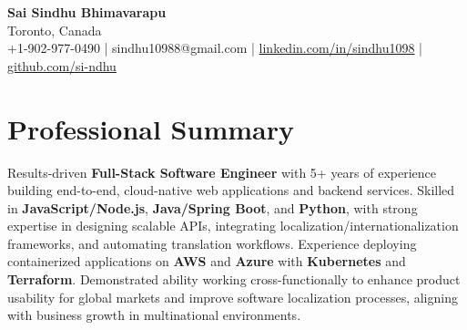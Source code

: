 \documentclass[letterpaper,11pt]{article}
\begin{document}
\begin{center}
  {\Large \textbf{Sai Sindhu Bhimavarapu}} \\
  Toronto, Canada \\
  +1-902-977-0490 \enspace | \enspace sindhu10988@gmail.com \enspace | \enspace \href{https://www.linkedin.com/in/sindhu1098/}{linkedin.com/in/sindhu1098} \enspace | \enspace \href{https://github.com/si-ndhu}{github.com/si-ndhu}
\end{center}

\section{Professional Summary}
  \begin{itemize}[leftmargin=0.15in, label={}]
    \small{\item{
     Results-driven \textbf{Full-Stack Software Engineer} with 5+ years of experience building end-to-end, cloud-native web applications and backend services. Skilled in \textbf{JavaScript/Node.js}, \textbf{Java/Spring Boot}, and \textbf{Python}, with strong expertise in designing scalable APIs, integrating localization/internationalization frameworks, and automating translation workflows. Experience deploying containerized applications on \textbf{AWS} and \textbf{Azure} with \textbf{Kubernetes} and \textbf{Terraform}. Demonstrated ability working cross-functionally to enhance product usability for global markets and improve software localization processes, aligning with business growth in multinational environments.
    }}
  \end{itemize}
\vspace{-16pt}

\end{document}

